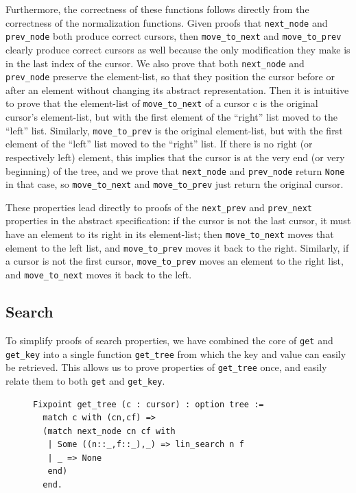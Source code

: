 \documentclass[a4paper,12pt]{article}
\begin{document}
Furthermore, the correctness of these functions follows directly from the correctness of the normalization functions. Given proofs that \texttt{next\_node} and \texttt{prev\_node} both produce correct cursors, then \texttt{move\_to\_next} and \texttt{move\_to\_prev} clearly produce correct cursors as well because the only modification they make is in the last index of the cursor. We also prove that both \texttt{next\_node} and \texttt{prev\_node} preserve the element-list, so that they position the cursor before or after an element without changing its abstract representation. Then it is intuitive to prove that the element-list of \texttt{move\_to\_next} of a cursor c is the original cursor’s element-list, but with the first element of the “right” list moved to the “left” list. Similarly, \texttt{move\_to\_prev} is the original element-list, but with the first element of the “left” list moved to the “right” list. If there is no right (or respectively left) element, this implies that the cursor is at the very end (or very beginning) of the tree, and we prove that \texttt{next\_node} and \texttt{prev\_node} return \texttt{None} in that case, so \texttt{move\_to\_next} and \texttt{move\_to\_prev} just return the original cursor.

These properties lead directly to proofs of the \texttt{next\_prev} and \texttt{prev\_next} properties in the abstract specification: if the cursor is not the last cursor, it must have an element to its right in its element-list; then \texttt{move\_to\_next} moves that element to the left list, and \texttt{move\_to\_prev} moves it back to the right. Similarly, if a cursor is not the first cursor, \texttt{move\_to\_prev} moves an element to the right list, and \texttt{move\_to\_next} moves it back to the left.

\subsection{Search}

To simplify proofs of search properties, we have combined the core of \texttt{get} and \texttt{get\_key} into a single function \texttt{get\_tree} from which the key and value can easily be retrieved. This allows us to prove properties of \texttt{get\_tree} once, and easily relate them to both \texttt{get} and \texttt{get\_key}.

\begin{figure}[h]
\begin{singlespace}
\begin{verbatim}
Fixpoint get_tree (c : cursor) : option tree :=
  match c with (cn,cf) =>
  (match next_node cn cf with
   | Some ((n::_,f::_),_) => lin_search n f
   | _ => None
   end)
  end.
\end{verbatim}
\end{singlespace}
\end{figure}
\end{document}
